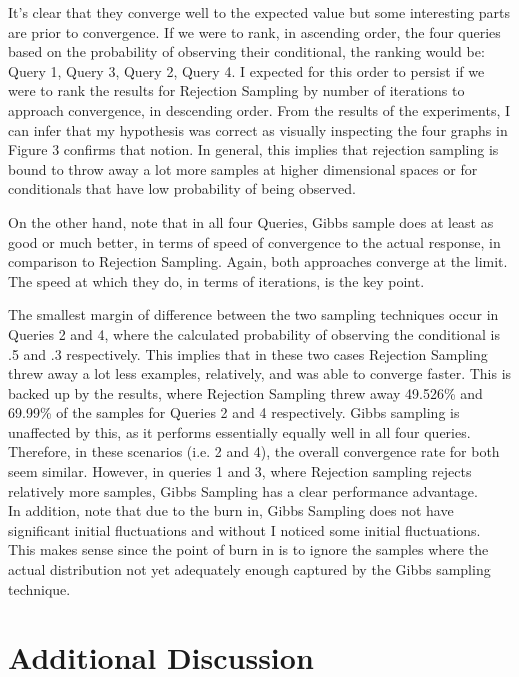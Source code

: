 \documentclass{article} %
\begin{document}
It's clear that they converge well to the expected value but some interesting parts are prior to convergence. If we were to rank, in ascending order, the four queries based on the probability of observing their conditional, the ranking would be: Query 1, Query 3, Query 2, Query 4. I expected for this order to persist if we were to rank the results for Rejection Sampling by number of iterations to approach convergence, in descending order. From the results of the experiments, I can infer that my hypothesis was correct as visually inspecting the four graphs in Figure 3 confirms that notion. In general, this implies that rejection sampling is bound to throw away a lot more samples at higher dimensional spaces or for conditionals that have low probability of being observed.

On the other hand, note that in all four Queries, Gibbs sample does at least as good or much better, in terms of speed of convergence to the actual response, in comparison to Rejection Sampling. Again, both approaches converge at the limit. The speed at which they do, in terms of iterations, is the key point. 

The smallest margin of difference between the two sampling techniques occur in Queries 2 and 4, where the calculated probability of observing the conditional is .5 and .3 respectively. This implies that in these two cases Rejection Sampling threw away a lot less examples, relatively, and was able to converge faster. This is backed up by the results, where Rejection Sampling threw away 49.526\% and 69.99\% of the samples for Queries 2 and 4 respectively. Gibbs sampling is unaffected by this, as it performs essentially equally well in all four queries. Therefore, in these scenarios (i.e. 2 and 4), the overall convergence rate for both seem similar. However, in queries 1 and 3, where Rejection sampling rejects relatively more samples, Gibbs Sampling has a clear performance advantage. \\

In addition, note that due to the burn in, Gibbs Sampling does not have significant initial fluctuations and without I noticed some initial fluctuations. This makes sense since the point of burn in is to ignore the samples where the actual distribution not yet adequately enough captured by the Gibbs sampling technique. 

\section{Additional Discussion}
\end{document}
